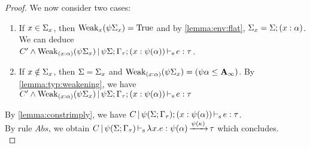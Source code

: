 \begin{theorem}
\begin{proof}
  We now consider two cases:
  \begin{enumerate}[leftmargin=*,noitemsep,topsep=5pt]
  \item If $x\in\Sigma_x$, then $\operatorname{Weak}_{x}(\mathrm{\psi}\Sigma_x) = \operatorname{True}$
    and by \cref{lemma:env:flat}, $\Sigma_x = \Sigma;(x : \alpha)$.
    We can deduce\\
    $C'\wedge \operatorname{Weak}_{(x : \alpha)}(\mathrm{\psi}\Sigma_x) \operatorname{|} \mathrm{\psi}\Sigma;\Gamma_\tau;(x : \mathrm{\psi}(\alpha)) \operatorname{\vdash_s} e : \tau$.
  \item If $x\notin\Sigma_x$, then $\Sigma = \Sigma_x$ and
    $\operatorname{Weak}_{(x : \alpha)}(\mathrm{\psi}\Sigma_x) = (\mathrm{\psi}\alpha \leq \mathbf{A}_\infty)$.
    By \cref{lemma:typ:weakening},
    we have\\
    $C'\wedge \operatorname{Weak}_{(x : \alpha)}(\mathrm{\psi}\Sigma_x) \operatorname{|} \mathrm{\psi}\Sigma;\Gamma_\tau;(x : \mathrm{\psi}(\alpha)) \operatorname{\vdash_s} e : \tau$
  \end{enumerate}
  By \cref{lemma:constrimply}, we
  have $C \operatorname{|} \mathrm{\psi}(\Sigma;\Gamma_\tau);(x : \mathrm{\psi}(\alpha)) \operatorname{\vdash_s} e : \tau$.\\
  By rule $Abs$, we obtain
  $C \operatorname{|} \mathrm{\psi}(\Sigma;\Gamma_\tau) \operatorname{\vdash_s} \lambda^{{}} x.{e} : \mathrm{\psi}(\alpha)\operatorname{\xrightarrow{\mathrm{\psi}(\kappa)}}\tau$ which concludes.
  \\






\end{proof}
\end{theorem}
